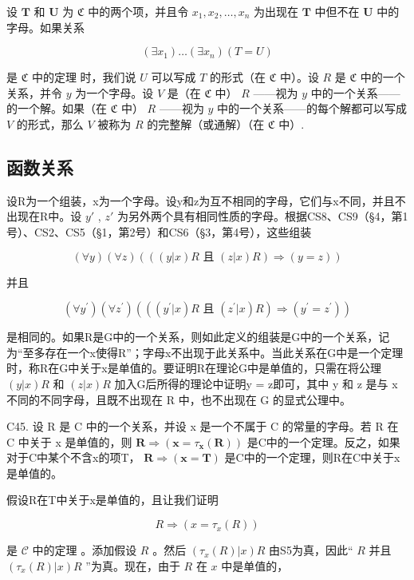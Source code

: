 设 \(\pmb{T}\) 和 \(\pmb{U}\) 为 \(\mathfrak{C}\) 中的两个项，并且令 \(x_1, x_2, \ldots, x_n\) 为出现在 \(\pmb{T}\) 中但不在 \(\pmb{U}\) 中的字母。如果关系

\[
(\exists x _ {1}) \dots (\exists x _ {n}) (T = U)
\]

是 \(\mathfrak{C}\) 中的定理 时，我们说 \(U\) 可以写成 \(T\) 的形式（在 \(\mathfrak{C}\) 中）。设 \(R\) 是 \(\mathfrak{C}\) 中的一个关系，并令 \(y\) 为一个字母。设 \(V\) 是（在 \(\mathfrak{C}\) 中） \(R\) ——视为 \(y\) 中的一个关系——的一个解。如果（在 \(\mathfrak{C}\) 中） \(R\) ——视为 \(y\) 中的一个关系——的每个解都可以写成 \(V\) 的形式，那么 \(V\) 被称为 \(R\) 的完整解（或通解）（在 \(\mathfrak{C}\) 中）.

\subsection{函数关系}

设R为一个组装，x为一个字母。设y和z为互不相同的字母，它们与x不同，并且不出现在R中。设 \(y'\) , \(z'\) 为另外两个具有相同性质的字母。根据CS8、CS9（§4，第1号）、CS2、CS5（§1，第2号）和CS6（§3，第4号），这些组装

\[
(\forall y) (\forall z) (((y | x) R \text { 且 } (z | x) R) \Longrightarrow (y = z))
\]

并且

\[
(\forall y ^ {\prime}) (\forall z ^ {\prime}) (((y ^ {\prime} | x) R \text { 且 } (z ^ {\prime} | x) R) \Longrightarrow (y ^ {\prime} = z ^ {\prime}))
\]

是相同的。如果R是G中的一个关系，则如此定义的组装是G中的一个关系，记为“至多存在一个x使得R”；字母x不出现于此关系中。当此关系在G中是一个定理时，称R在G中关于x是单值的。要证明R在理论G中是单值的，只需在将公理 \((y|x)R\) 和 \((z|x)R\) 加入G后所得的理论中证明y = z即可，其中 y 和 z 是与 x 不同的不同字母，且既不出现在 R 中，也不出现在 G 的显式公理中。

C45. 设 R 是 C 中的一个关系，并设 x 是一个不属于 C 的常量的字母。若 R 在 C 中关于 x 是单值的，则 \(\mathbf{R} \Longrightarrow (\mathbf{x} = \tau_{\mathbf{x}}(\mathbf{R}))\) 是C中的一个定理。反之，如果对于C中某个不含x的项T， \(\mathbf{R} \Longrightarrow (\mathbf{x} = \mathbf{T})\) 是C中的一个定理，则R在C中关于x是单值的。

假设R在T中关于x是单值的，且让我们证明

\[
R \Longrightarrow (x = \tau_ {x} (R))
\]

是 \(\mathcal{C}\) 中的定理 。添加假设 \(R\) 。然后 \((\tau_{x}(R)|x)R\) 由S5为真，因此“ \(R\) 并且 \((\tau_{x}(R)|x)R\) ”为真。现在，由于 \(R\) 在 \(x\) 中是单值的，

